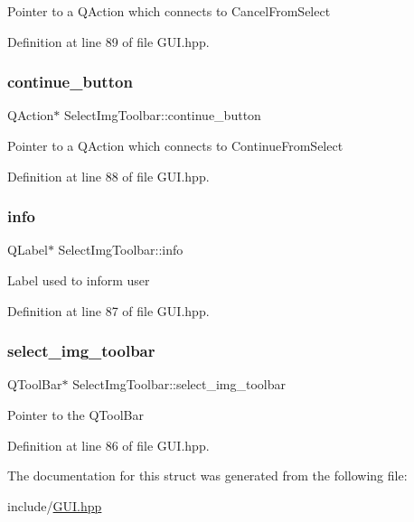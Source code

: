 Pointer to a Q\+Action which connects to Cancel\+From\+Select 

Definition at line 89 of file G\+U\+I.\+hpp.

\mbox{\label{structSelectImgToolbar_a82569764f9d7e13b406a668e9e50290a}} 
\subsubsection{\texorpdfstring{continue\+\_\+button}{continue\_button}}
{\footnotesize\ttfamily Q\+Action$\ast$ Select\+Img\+Toolbar\+::continue\+\_\+button}

Pointer to a Q\+Action which connects to Continue\+From\+Select 

Definition at line 88 of file G\+U\+I.\+hpp.

\mbox{\label{structSelectImgToolbar_a3cf6ac92fbe60877873c89939217e1de}} 
\subsubsection{\texorpdfstring{info}{info}}
{\footnotesize\ttfamily Q\+Label$\ast$ Select\+Img\+Toolbar\+::info}

Label used to inform user 

Definition at line 87 of file G\+U\+I.\+hpp.

\mbox{\label{structSelectImgToolbar_a779bc326cf08c9fbcd1ffebb43a664eb}} 
\subsubsection{\texorpdfstring{select\+\_\+img\+\_\+toolbar}{select\_img\_toolbar}}
{\footnotesize\ttfamily Q\+Tool\+Bar$\ast$ Select\+Img\+Toolbar\+::select\+\_\+img\+\_\+toolbar}

Pointer to the Q\+Tool\+Bar 

Definition at line 86 of file G\+U\+I.\+hpp.



The documentation for this struct was generated from the following file\+:\begin{DoxyCompactItemize}
\item 
include/\mbox{\hyperlink{GUI_8hpp}{G\+U\+I.\+hpp}}\end{DoxyCompactItemize}

